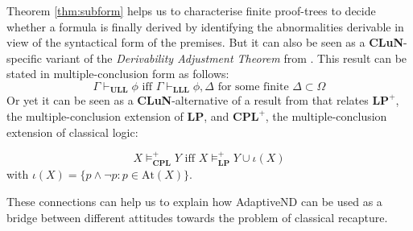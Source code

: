 \documentclass[]{article}
\newcommand{\At}{\ensuremath{\mathrm{At}}}
\begin{document}
Theorem \ref{thm:subform} helps us to characterise finite proof-trees to decide whether a formula is finally derived by identifying the abnormalities derivable in view of the syntactical form of the premises. But it can also be seen as a \textbf{CLuN}-specific variant of the \emph{Derivability Adjustment Theorem} from \cite{batens07}. This result can be stated in multiple-conclusion form as follows:
\[
    \Gamma \vdash_{\mathbf{ULL}} \phi \text{ iff } \Gamma \vdash_{\mathbf{LLL}} \phi, \Delta \text{ for some finite } \Delta \subset \Omega
\]
Or yet it can be seen as a \textbf{CLuN}-alternative of a result from \cite{Beall:TheReviewOfSymbolicLogic:2011} that relates $\mathbf{LP}^{+}$, the multiple-conclusion extension of \textbf{LP}, and $\mathbf{CPL}^{+}$, the multiple-conclusion extension of classical logic:

\[
    X \models_{\mathbf{CPL}}^+ Y \text{ iff } X \models_{\mathbf{LP}}^+ Y \cup \iota(X) \tag{LP/CPL}\label{beall}
\]
with $\iota(X) = \{p \wedge \neg p : p \in \At(X)\}$.

These connections can help us to explain how \textsf{AdaptiveND} can be used as a bridge between different attitudes towards the problem of classical recapture.
\end{document}
